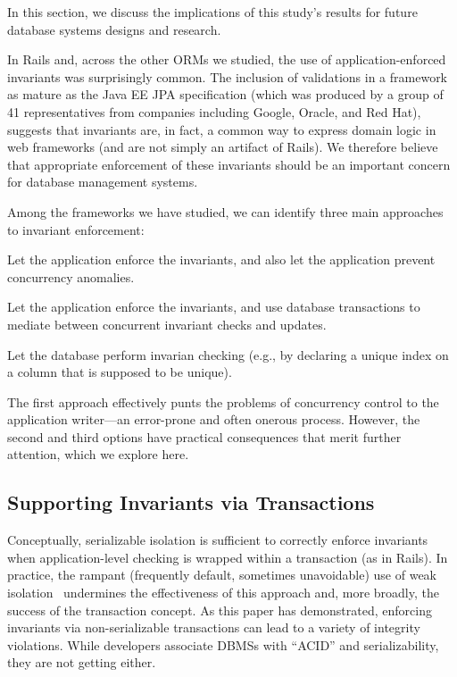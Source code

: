 In this section, we discuss the implications of this study's results
for future database systems designs and research.

In Rails and, across the other ORMs we studied, the use of
application-enforced invariants was surprisingly common. The
inclusion of validations in a framework as mature as the Java EE JPA
specification (which was produced by a group of 41 representatives
from companies including Google, Oracle, and Red Hat), suggests that
invariants are, in fact, a common way to express domain logic in web
frameworks (and are not simply an artifact of Rails). We therefore
believe that appropriate enforcement of these invariants should be an
important concern for database management systems.

Among the frameworks we have studied, we can identify three main
approaches to invariant enforcement:
\begin{defendenumerate}
\item Let the application enforce the invariants, and also let
  the application prevent concurrency anomalies.

\item Let the application enforce the invariants, and use database
  transactions to mediate between concurrent invariant checks and updates.

\item Let the database perform invarian checking (e.g., by declaring a
  unique index on a column that is supposed to be unique).
\end{defendenumerate}

The first approach effectively punts the problems of concurrency
control to the application writer---an error-prone and often onerous
process. However, the second and third options have practical
consequences that merit further attention, which we explore here.

\subsection{Supporting Invariants via Transactions}

Conceptually, serializable
isolation is sufficient to correctly enforce invariants when
application-level checking is wrapped within a transaction (as in
Rails). In practice, the rampant (frequently default, sometimes
unavoidable) use of weak isolation~\cite{hat-vldb} undermines the
effectiveness of this approach and, more broadly, the success of the
transaction concept. As this paper has demonstrated, enforcing invariants via
non-serializable transactions can lead to a variety of integrity
violations. While developers associate DBMSs with ``ACID'' and
serializability, they are not getting either.

